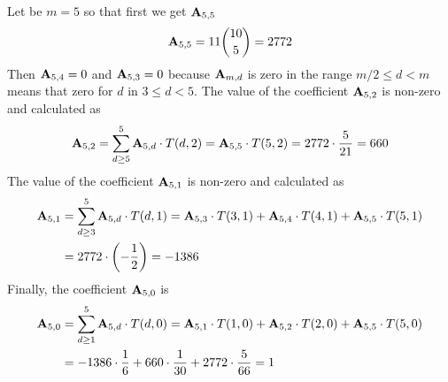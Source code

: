 \begin{example}
    Let be $m=5$ so that first we get ${\mathbf{A}} \sb{5,5}$
    \begin{equation*}
        {\mathbf{A}} \sb{5,5} = 11 \binom{10}{5}= 2772
    \end{equation*}
    Then ${\mathbf{A}} \sb{5,4} = 0$ and ${\mathbf{A}} \sb{5,3} = 0$
    because ${\mathbf{A}} \sb{m,d}$ is zero in the range $m/2 \leq d < m$ means that zero for $d$ in $3 \leq d < 5$.
    The value of the coefficient ${\mathbf{A}} \sb{5,2}$ is non-zero and calculated as
    \begin{equation*}
        \begin{split}
            {\mathbf{A}} \sb{5,2}
            = \sum_{d \geq 5}^{5} {\mathbf{A}} \sb{5,d} \cdot T(d,2) = {\mathbf{A}} \sb{5,5} \cdot T(5,2) = 2772 \cdot \frac{5}{21} = 660
        \end{split}
    \end{equation*}
    The value of the coefficient ${\mathbf{A}} \sb{5,1}$ is non-zero and calculated as
    \begin{equation*}
        \begin{split}
            {\mathbf{A}} \sb{5,1}
            &= \sum_{d \geq 3}^{5} {\mathbf{A}} \sb{5,d} \cdot T(d,1)
            = {\mathbf{A}} \sb{5,3} \cdot T(3,1) + {\mathbf{A}} \sb{5,4} \cdot T(4,1) + {\mathbf{A}} \sb{5,5} \cdot T(5,1) \\
            &= 2772 \cdot \left( - \frac{1}{2} \right) = -1386
        \end{split}
    \end{equation*}
    Finally, the coefficient ${\mathbf{A}} \sb{5,0}$ is
    \begin{equation*}
        \begin{split}
            {\mathbf{A}} \sb{5,0}
            &= \sum_{d \geq 1}^{5} {\mathbf{A}} \sb{5,d} \cdot T(d, 0)
            = {\mathbf{A}} \sb{5,1} \cdot T(1, 0) + {\mathbf{A}} \sb{5,2} \cdot T(2, 0) + {\mathbf{A}} \sb{5,5} \cdot T(5, 0) \\
            &= -1386 \cdot \frac{1}{6} + 660 \cdot \frac{1}{30} + 2772 \cdot \frac{5}{66} = 1
        \end{split}
    \end{equation*}
\end{example}
